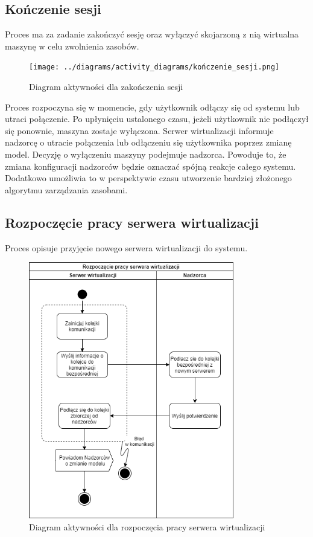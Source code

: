 \documentclass[../opis-rozwiazania.tex]{subfiles}
\begin{document}
\subsection{Kończenie sesji}

Proces ma za zadanie zakończyć sesję oraz wyłączyć skojarzoną z nią wirtualna maszynę w celu zwolnienia zasobów.

\begin{figure}[H]
  \centering
  \texttt{[image: ../diagrams/activity\_diagrams/kończenie\_sesji.png]}
  \caption{Diagram aktywności dla zakończenia sesji}
  \label{finish_session}
\end{figure}

Proces rozpoczyna się w momencie, gdy użytkownik odłączy się od systemu lub utraci połączenie. Po upłynięciu ustalonego czasu, jeżeli użytkownik nie podłączył się ponownie, maszyna zostaje wyłączona.
Serwer wirtualizacji informuje nadzorcę o utracie połączenia lub odłączeniu się użytkownika poprzez zmianę model.
Decyzję o wyłączeniu maszyny podejmuje nadzorca.
Powoduje to, że zmiana konfiguracji nadzorców będzie oznaczać spójną reakcje całego systemu.
Dodatkowo umożliwia to w perspektywie czasu utworzenie bardziej złożonego algorytmu zarządzania zasobami. %

\subsection{Rozpoczęcie pracy serwera wirtualizacji}

Proces opisuje przyjęcie nowego serwera wirtualizacji do systemu.

\begin{figure}[H]
  \centering
  \includegraphics[width=0.8\textwidth]{../diagrams/activity_diagrams/serwer_start.png}
  \caption{Diagram aktywności dla rozpoczęcia pracy serwera wirtualizacji}
  \label{start_virtsrv}
\end{figure}
\end{document}
